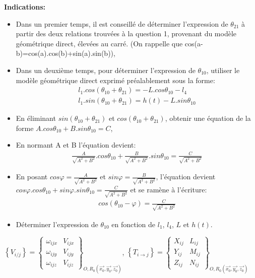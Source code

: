 \textbf{Indications:}
\begin{itemize}
 \item Dans un premier temps, il est conseillé de déterminer l'expression de $\theta_{21}$ à partir des deux relations trouvées à la question 1, provenant du modèle géométrique direct, élevées au carré. (On rappelle que cos(a-b)=cos(a).cos(b)+sin(a).sin(b)),
 \item Dans un deuxième temps, pour déterminer l'expression de $\theta_{10}$, utiliser le modèle géométrique direct exprimé préalablement sous la forme:
 \begin{eqnarray}
	l_1.cos(\theta_{10}+\theta_{21}) = -L.cos\theta_{10} - l_4 \\
	l_1.sin(\theta_{10}+\theta_{21}) = h(t) - L.sin\theta_{10}
 \end{eqnarray}
 \item En éliminant $sin(\theta_{10}+\theta_{21})$ et $cos(\theta_{10}+\theta_{21})$, obtenir une équation de la forme $A.cos\theta_{10} + B.sin\theta_{10} = C$,
 \item En normant A et B l'équation devient:
 \begin{eqnarray}
	\frac{A}{\sqrt{A^2+B^2}}.cos\theta_{10}+\frac{B}{\sqrt{A^2+B^2}}.sin\theta_{10}=\frac{C}{\sqrt{A^2+B^2}}
 \end{eqnarray}
 \item En posant $cos \varphi=\frac{A}{\sqrt{A^2+B^2}}$ et $sin \varphi=\frac{B}{\sqrt{A^2+B^2}}$, l'équation devient $cos \varphi.cos \theta_{10}+sin \varphi.sin \theta_{10}=\frac{C}{\sqrt{A^2+B^2}}$ et se ramène à l'écriture:
  \begin{eqnarray}
	cos(\theta_{10}-\varphi)=\frac{C}{\sqrt{A^2+B^2}}
 \end{eqnarray}
 \item Déterminer l'expression de $\theta_{10}$ en fonction de $l_1$, $l_4$, $L$ et $h(t)$.
\end{itemize}	



\begin{center}
$\left\{V_{i/j}\right\}=\left\{\begin{array}{cc}
\omega_{ijx} & V_{ijx} \\
\omega_{ijy} & V_{ijy} \\
\omega_{ijz} & V_{ijz}
\end{array}\right\}_{O,R_0(\overrightarrow{x_0},\overrightarrow{y_0},\overrightarrow{z_0})}$,
$\left\{T_{i\rightarrow j}\right\}=\left\{\begin{array}{cc}
X_{ij} & L_{ij} \\
Y_{ij} & M_{ij} \\
Z_{ij} & N_{ij}
\end{array}\right\}_{O,R_0(\overrightarrow{x_0},\overrightarrow{y_0},\overrightarrow{z_0})}$
\end{center}

